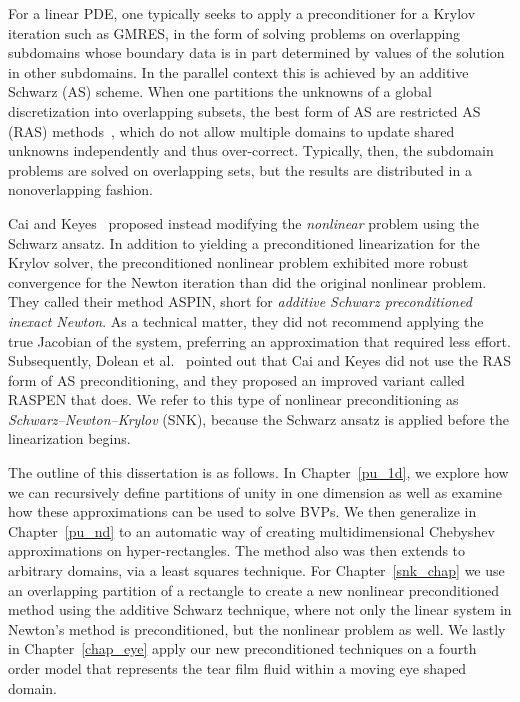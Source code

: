 For a linear PDE, one typically seeks to apply a preconditioner for a Krylov iteration such as GMRES, in the form of solving problems on overlapping subdomains whose boundary data is in part determined by values of the solution in other subdomains. In the parallel context this is achieved by an additive Schwarz (AS) scheme. When one partitions the unknowns of a global discretization into overlapping subsets, the best form of AS are restricted AS (RAS) methods~\cite{Cai1999}, which do not allow multiple domains to update shared unknowns independently and thus over-correct. Typically, then, the subdomain problems are solved on overlapping sets, but the results are distributed in a nonoverlapping fashion. 
%

Cai and Keyes~\cite{Cai2002} proposed instead modifying the \emph{nonlinear} problem using the Schwarz ansatz. In addition to yielding a preconditioned linearization for the Krylov solver, the preconditioned nonlinear problem exhibited more robust convergence for the Newton iteration than did the original nonlinear problem. They called their method ASPIN, short for \textit{additive Schwarz preconditioned inexact Newton}. As a technical matter, they did not recommend applying the true Jacobian of the system, preferring an approximation that required less effort. Subsequently, Dolean et al.~\cite{Dolean2016} pointed out that Cai and Keyes did not use the RAS form of AS preconditioning, and they proposed an improved variant called RASPEN that does. We refer to this type of nonlinear preconditioning as \emph{Schwarz--Newton--Krylov} (SNK), because the Schwarz ansatz is applied before the linearization begins.



 The outline of this dissertation is as follows. In Chapter~\ref{pu_1d}, we explore how we can recursively define partitions of unity in one dimension as well as examine how these approximations can be used to solve BVPs. We then generalize in Chapter~\ref{pu_nd} to an automatic way of creating multidimensional Chebyshev approximations on hyper-rectangles. The method also was then extends to arbitrary domains, via a least squares technique. For Chapter~\ref{snk_chap} we use an overlapping partition of a rectangle to create a new nonlinear preconditioned method using the additive Schwarz technique, where not only the linear system in Newton's method is preconditioned, but the nonlinear problem as well. We lastly in Chapter~\ref{chap_eye} apply our new preconditioned techniques on a fourth order model that represents the tear film fluid within a moving eye shaped domain.

